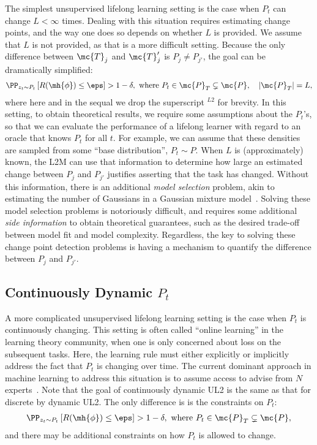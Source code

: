 \documentclass{article}
\begin{document}
The simplest unsupervised lifelong learning setting is the case when $P_t$ can change $L < \infty$ times.  Dealing with this situation requires estimating change points, and the way one does so depends on whether $L$ is provided.  We assume that $L$ is not provided, as that is a more difficult setting.  Because  the only difference between $\mc{T}_j$ and $\mc{T}_j'$ is $P_j \neq P_{j'}$, the goal can be dramatically simplified:
\begin{align} \label{eq:online}        
    \PP_{ z_t \sim P_t} \left[R(\mh{\phi})  \leq \eps \right] > 1 - \delta, \text{ where } P_t \in \mc{P}_T \subsetneq \mc{P}, \quad |\mc{P}_T| = L,
\end{align}
where here and in the sequal we drop the superscript $^{L2}$ for brevity. In this setting, to obtain theoretical results, we require some assumptions about the $P_t$'s, so that we can evaluate the performance of a lifelong learner with regard to an oracle that knows $P_t$ for all $t$.  For example, we can assume that these densities are sampled from some ``base distribution'', $P_t \sim P$. When $L$ is (approximately) known, the L2M can use that information to determine how large an estimated change between $P_j$ and $P_{j'}$ justifies asserting that the task has changed.  Without this information, there is an additional \emph{model selection} problem, akin to estimating the number of Gaussians in a Gaussian mixture model~\cite{Fraley2002-rm}.  Solving these model selection problems is notoriously difficult, and requires some additional \emph{side information} to obtain theoretical guarantees, such as the desired trade-off between model fit and model complexity.  Regardless, the key to solving these change point detection problems is having a mechanism to quantify the difference between $P_j$ and $P_{j'}$. 




\subsection{Continuously Dynamic $P_t$}
\label{sec:smooth}

A  more complicated unsupervised lifelong learning setting is the case when $P_t$ is continuously changing.  This setting is often called ``online learning'' in the learning theory community, when one is only concerned about loss on the subsequent tasks. Here, the learning rule must either explicitly or implicitly address the fact that $P_t$ is  changing over time.  The current dominant approach in machine learning to address this situation is to assume access to advise from $N$ experts~\cite{Mohri2018-tf}. Note that the goal of continuously dynamic UL2 is the same as that for discrete by dynamic UL2.  The only difference is is the constraints on $P_t$:
\begin{align} \label{eq:online}        
    \PP_{ z_t \sim P_t} \left[R(\mh{\phi})  \leq \eps \right] > 1 - \delta, \text{ where } P_t \in \mc{P}_T \subsetneq \mc{P}, 
\end{align}
and there may be additional constraints on how $P_t$ is allowed to change.
\end{document}
